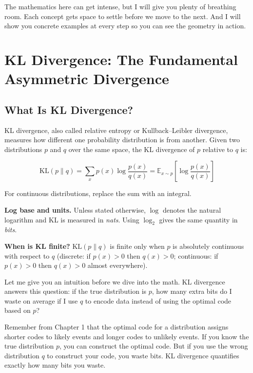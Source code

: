 The mathematics here can get intense, but I will give you plenty of breathing room. Each concept gets space to settle before we move to the next. And I will show you concrete examples at every step so you can see the geometry in action.

\vspace{2em}

\section{KL Divergence: The Fundamental Asymmetric Divergence}

\subsection{What Is KL Divergence?}

KL divergence, also called relative entropy or Kullback--Leibler divergence, measures how different one probability distribution is from another. Given two distributions $p$ and $q$ over the same space, the KL divergence of $p$ relative to $q$ is:

\begin{equation}
\text{KL}(p \| q) = \sum_{x} p(x) \log \frac{p(x)}{q(x)} = \mathbb{E}_{x \sim p}\left[\log \frac{p(x)}{q(x)}\right]
\end{equation}

For continuous distributions, replace the sum with an integral.

\begin{notationbox}
\textbf{Log base and units.} Unless stated otherwise, $\log$ denotes the natural logarithm and KL is measured in \emph{nats}. Using $\log_2$ gives the same quantity in \emph{bits}.

\textbf{When is KL finite?} $\text{KL}(p\|q)$ is finite only when $p$ is absolutely continuous with respect to $q$ (discrete: if $p(x)>0$ then $q(x)>0$; continuous: if $p(x)>0$ then $q(x)>0$ almost everywhere).
\end{notationbox}

Let me give you an intuition before we dive into the math. KL divergence answers this question: if the true distribution is $p$, how many extra bits do I waste on average if I use $q$ to encode data instead of using the optimal code based on $p$?

\vspace{1em}

Remember from Chapter 1 that the optimal code for a distribution assigns shorter codes to likely events and longer codes to unlikely events. If you know the true distribution $p$, you can construct the optimal code. But if you use the wrong distribution $q$ to construct your code, you waste bits. KL divergence quantifies exactly how many bits you waste.

